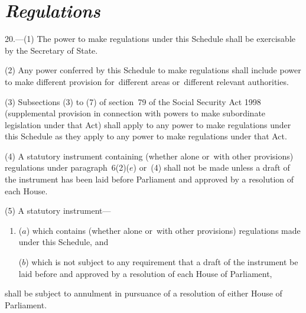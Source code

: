 \documentclass[12pt,a4paper]{article}
\begin{document}

\section*{\itshape Regulations}

20.---(1) The power to make regulations under this Schedule shall be 
%
exercisable by the Secretary of State.  %

(2) Any power conferred by this Schedule to make regulations shall include power to make different provision for~different areas or~different relevant authorities.

(3) Subsections (3)  to (7)  of section~79 of the Social Security Act 1998 (supplemental provision in connection with powers to make subordinate legislation under that Act) shall apply to any power to make regulations under this Schedule as they apply to any power to make regulations under that Act.

(4) A statutory instrument containing (whether alone or~with other provisions) regulations under paragraph~6(2)($e$)  
or~(4)  
shall not be made unless a draft of the instrument has been laid before Parliament and approved by a resolution of each House.

(5) A statutory instrument—
\begin{enumerate}\item[]
($a$) which contains (whether alone or~with other provisions) regulations made under this Schedule, and

($b$) which is not subject to any requirement that a draft of the instrument be laid before and approved by a resolution of each House of Parliament,
\end{enumerate}
shall be subject to annulment in pursuance of a resolution of either House of Parliament.
\end{document}
